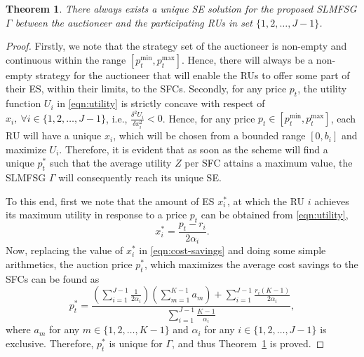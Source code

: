 \documentclass[journal,10pt]{IEEEtran}
\newtheorem{theorem}{\bf Theorem}
\begin{document}
\begin{theorem}
There always exists a unique SE solution for the proposed SLMFSG $\Gamma$ between the auctioneer and the participating RUs in set $\{1,2,\hdots,J-1\}$.
\label{theorem:1}
\end{theorem}
\begin{proof}
Firstly, we note that the strategy set of the auctioneer is non-empty and continuous within the range $\left[p_t^\text{min}, p_t^\text{max}\right]$. Hence, there will always be a non-empty strategy for the auctioneer that will enable the RUs to offer some part of their ES, within their limits, to the SFCs. Secondly, for any price $p_t$, the utility function $U_i$ in \eqref{eqn:utility} is strictly concave with respect of $x_i,~\forall i\in\{1, 2, \hdots, J-1\}$, i.e., $\frac{\delta^2 U_i}{\delta x_i^2}<0$. Hence, for any price $p_t\in\left[p_t^\text{min}, p_t^\text{max}\right]$, each RU will have a unique $x_i$, which will be chosen from a bounded range $[0, b_i]$ and maximize $U_i$. Therefore, it is evident that as soon as the scheme will find a unique $p_t^*$ such that the average utility $Z$ per SFC attains a maximum value, the SLMFSG $\Gamma$ will consequently reach its unique SE.

To this end, first we note that the amount of ES $x_i^*$, at which the RU $i$ achieves its maximum utility in response to a price $p_t$ can be obtained from \eqref{eqn:utility},
\begin{equation}
x_i^* = \frac{p_t - r_i}{2\alpha_i}.\label{eqn:SE-energy}
\end{equation}
Now, replacing the value of $x_i^*$ in \eqref{eqn:cost-savings} and doing some simple arithmetics, the auction price $p_t^*$, which maximizes the average cost savings to the SFCs  can be found as
\begin{equation}
p_t^* = \frac{\left(\sum_{i=1}^{J-1}\frac{1}{2\alpha_i}\right)\left(\sum_{m=1}^{K-1}a_m\right) + \sum_{i=1}^{J-1}\frac{r_i(K-1)}{2\alpha_i}}{\sum_{i=1}^{J-1}\frac{K-1}{\alpha_i}},
\label{eqn:SE-price}
\end{equation}
where $a_m$ for any $m\in\{1, 2, \hdots, K-1\}$ and $\alpha_i$ for any $i\in\{1, 2, \hdots, J-1\}$ is exclusive. Therefore, $p_t^*$ is unique for $\Gamma$, and thus Theorem~\ref{theorem:1} is proved.
\end{proof}
\end{document}
